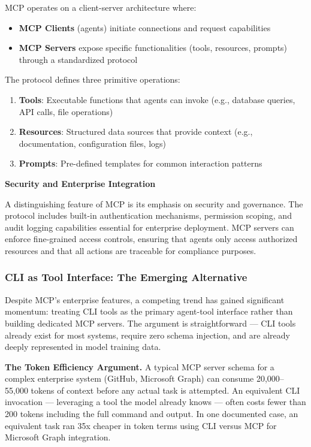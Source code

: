 MCP operates on a client-server architecture where:
\begin{itemize}
    \item \textbf{MCP Clients} (agents) initiate connections and request capabilities
    \item \textbf{MCP Servers} expose specific functionalities (tools, resources, prompts) through a standardized protocol

\end{itemize}
The protocol defines three primitive operations:

\begin{enumerate}
    \item \textbf{Tools}: Executable functions that agents can invoke (e.g., database queries, API calls, file operations)
    \item \textbf{Resources}: Structured data sources that provide context (e.g., documentation, configuration files, logs)
    \item \textbf{Prompts}: Pre-defined templates for common interaction patterns

\end{enumerate}
\textbf{Security and Enterprise Integration}

A distinguishing feature of MCP is its emphasis on security and governance. The protocol includes built-in authentication mechanisms, permission scoping, and audit logging capabilities essential for enterprise deployment. MCP servers can enforce fine-grained access controls, ensuring that agents only access authorized resources and that all actions are traceable for compliance purposes.

\subsubsection{CLI as Tool Interface: The Emerging Alternative}

Despite MCP's enterprise features, a competing trend has gained significant momentum: treating CLI tools as the primary agent-tool interface rather than building dedicated MCP servers. The argument is straightforward — CLI tools already exist for most systems, require zero schema injection, and are already deeply represented in model training data.

\textbf{The Token Efficiency Argument.} A typical MCP server schema for a complex enterprise system (GitHub, Microsoft Graph) can consume 20,000–55,000 tokens of context before any actual task is attempted. An equivalent CLI invocation — leveraging a tool the model already knows — often costs fewer than 200 tokens including the full command and output. In one documented case, an equivalent task ran 35x cheaper in token terms using CLI versus MCP for Microsoft Graph integration.

